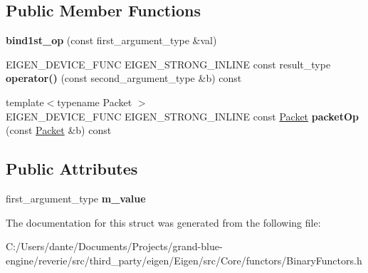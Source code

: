 \subsection*{Public Member Functions}
\begin{DoxyCompactItemize}
\item 
\mbox{\label{struct_eigen_1_1internal_1_1bind1st__op_ad94de0363c64e023025e925eecfe3bee}} 
{\bfseries bind1st\+\_\+op} (const first\+\_\+argument\+\_\+type \&val)
\item 
\mbox{\label{struct_eigen_1_1internal_1_1bind1st__op_ab6afd4a874b1cc79c44b3212f34b773f}} 
E\+I\+G\+E\+N\+\_\+\+D\+E\+V\+I\+C\+E\+\_\+\+F\+U\+NC E\+I\+G\+E\+N\+\_\+\+S\+T\+R\+O\+N\+G\+\_\+\+I\+N\+L\+I\+NE const result\+\_\+type {\bfseries operator()} (const second\+\_\+argument\+\_\+type \&b) const
\item 
\mbox{\label{struct_eigen_1_1internal_1_1bind1st__op_a3c64838212ad6e17a20a0452e3dd87e3}} 
{\footnotesize template$<$typename Packet $>$ }\\E\+I\+G\+E\+N\+\_\+\+D\+E\+V\+I\+C\+E\+\_\+\+F\+U\+NC E\+I\+G\+E\+N\+\_\+\+S\+T\+R\+O\+N\+G\+\_\+\+I\+N\+L\+I\+NE const \mbox{\hyperlink{union_eigen_1_1internal_1_1_packet}{Packet}} {\bfseries packet\+Op} (const \mbox{\hyperlink{union_eigen_1_1internal_1_1_packet}{Packet}} \&b) const
\end{DoxyCompactItemize}
\subsection*{Public Attributes}
\begin{DoxyCompactItemize}
\item 
\mbox{\label{struct_eigen_1_1internal_1_1bind1st__op_a44102df580616a3ca34b6623abbf65d4}} 
first\+\_\+argument\+\_\+type {\bfseries m\+\_\+value}
\end{DoxyCompactItemize}


The documentation for this struct was generated from the following file\+:\begin{DoxyCompactItemize}
\item 
C\+:/\+Users/dante/\+Documents/\+Projects/grand-\/blue-\/engine/reverie/src/third\+\_\+party/eigen/\+Eigen/src/\+Core/functors/Binary\+Functors.\+h\end{DoxyCompactItemize}
